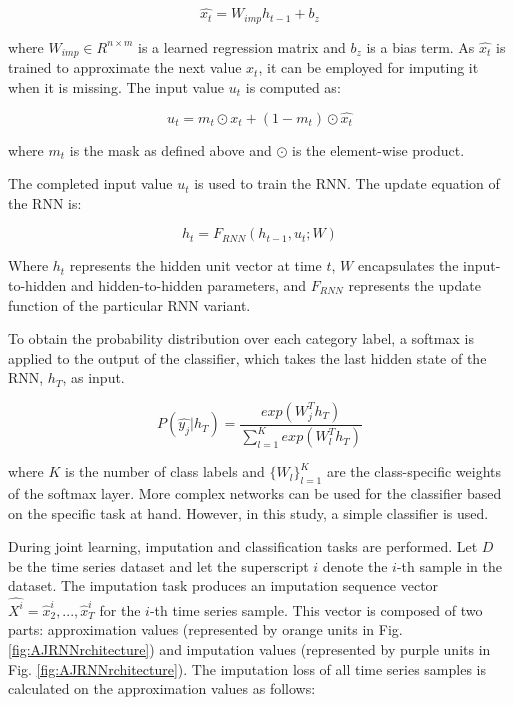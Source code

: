 \begin{equation}
  \hat{x_t} = W_{imp} h_{t-1} + b_z
\end{equation}

where $W_{imp} \in R^{n \times  m}$ is a learned regression matrix and $b_z$ is a bias term. 
As $\hat{x_t}$ is trained to approximate the next value $x_t$, it can be employed for imputing it when it is missing.
The input value $u_t$ is computed as:

\begin{equation}
  u_t = m_t \odot x_t + (1 - m_t) \odot \hat{x_t}
  \label{eq:AJRNNinput}
\end{equation}

where $m_t$ is the mask as defined above and $\odot$ is the element-wise product.

The completed input value $u_t$ is used to train the RNN.
The update equation of the RNN is:

\begin{equation}
  h_t = F_{RNN} (h_{t-1}, u_t; W)
\end{equation}

Where $h_t$ represents the hidden unit vector at time $t$, $W$ encapsulates the input-to-hidden and hidden-to-hidden parameters, and $F_{RNN}$ represents the update function of the particular RNN variant.

To obtain the probability distribution over each category label, a softmax is applied to the output of the classifier, which takes the last hidden state of the RNN, $h_T$, as input.

\begin{equation}
  P(\hat{y_j}|h_T ) = \frac{exp(W^T_j  h_T )}{\sum_{l=1}^K exp(W^T_l  h_T )}
  \label{eq:AJRNNsoftmax}
\end{equation}

where $K$ is the number of class labels and $\{W_l\}^K_{l=1}$ are the class-specific weights of the softmax layer.
More complex networks can be used for the classifier based on the specific task at hand. However, in this study, a simple classifier is used.

During joint learning, imputation and classification tasks are performed. 
Let $D$ be the time series dataset and let the superscript $i$ denote the $i$-th sample in the dataset.
The imputation task produces an imputation sequence vector $\hat{X^i} = { \hat{x}^i_2, ..., \hat{x}^i_T }$ for the $i$-th time series sample.
This vector is composed of two parts: approximation values (represented by orange units in Fig. \ref{fig:AJRNNrchitecture}) and imputation values (represented by purple units in Fig. \ref{fig:AJRNNrchitecture}).  
The imputation loss of all time series samples is calculated on the approximation values as follows:

